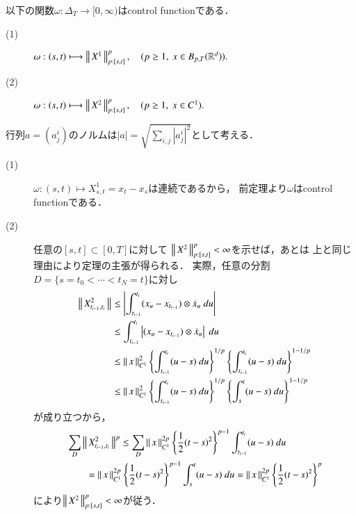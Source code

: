 	\begin{screen}
		\begin{thm}\label{thm:examples_of_control_functions}
			以下の関数$\omega:\Delta_T \longrightarrow [0,\infty)$はcontrol functionである．
			\begin{description}
				\item[(1)] $\omega:(s,t) \longmapsto \left\|\, X^1\, \right\|_{p:[s,t]}^p,
					\quad (p \geq 1,\ x \in B_{p,T}(\mathbb{R}^d)).$
				\item[(2)] $\omega:(s,t) \longmapsto \left\|\, X^2\, \right\|_{p:[s,t]}^p,
					\quad (p \geq 1,\ x \in C^1).$
			\end{description}
		\end{thm}
	\end{screen}
	
	行列$a = (a_j^i)$のノルムは$|a| = \sqrt{\sum_{i,j}|a_j^i|^2}$として考える．
	
	\begin{thm}\mbox{}
		\begin{description}
			\item[(1)] $\omega:(s,t) \longmapsto X^1_{s,t} = x_t - x_s$は連続であるから，
				前定理より$\omega$はcontrol functionである．
				
			\item[(2)] 任意の$[s,t] \subset [0,T]$に対して
				$\left\|\, X^2\, \right\|_{p:[s,t]}^p < \infty$を示せば，あとは
				上と同じ理由により定理の主張が得られる．
				実際，任意の分割$D = \{s=t_0 < \cdots < t_N = t\}$に対し
				\begin{align}
					\left\|\, X^2_{t_{i-1},t_i}\, \right\|_{}
					&\leq \left| \int_{t_{i-1}}^{t_i} (x_u - x_{t_{i-1}}) \otimes \dot{x}_u\ du \right| \\
					&\leq \int_{t_{i-1}}^{t_i} \left| (x_u - x_{t_{i-1}}) \otimes \dot{x}_u \right|\ du \\
					&\leq \left\|\, x\, \right\|_{C^1}^2 \left\{ \int_{t_{i-1}}^{t_i} (u-s)\ du \right\}^{1/p}
						\left\{ \int_{t_{i-1}}^{t_i} (u-s)\ du \right\}^{1-1/p} \\
					&\leq \left\|\, x\, \right\|_{C^1}^2 \left\{ \int_{t_{i-1}}^{t_i} (u-s)\ du \right\}^{1/p}
						\left\{ \int_s^t (u-s)\ du \right\}^{1-1/p}
				\end{align}
				が成り立つから，
				\begin{align}
					&\sum_D \left\|\, X^2_{t_{i-1},t_i}\, \right\|_{}^p
					\leq \sum_D \left\|\, x\, \right\|_{C^1}^{2p} \left\{ \frac{1}{2}(t-s)^2 \right\}^{p-1}
						\int_{t_{i-1}}^{t_i} (u-s)\ du \\
					&\qquad= \left\|\, x\, \right\|_{C^1}^{2p} \left\{ \frac{1}{2}(t-s)^2 \right\}^{p-1}
						\int_s^t (u-s)\ du
					= \left\|\, x\, \right\|_{C^1}^{2p} \left\{ \frac{1}{2}(t-s)^2 \right\}^p
				\end{align}
				により$\left\|\, X^2\, \right\|_{p:[s,t]}^p < \infty$が従う．
				\QED
		\end{description}
	\end{thm}
	
